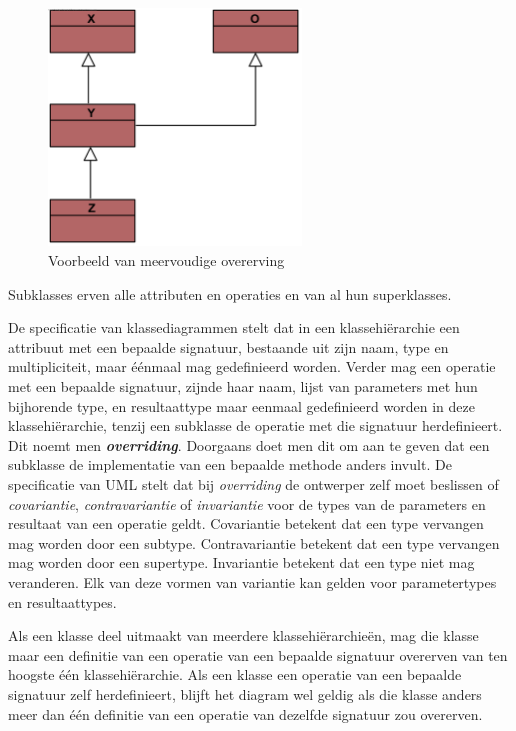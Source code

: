 \begin{figure}
	\centering
	\includegraphics[width=0.6\textwidth]{chap-consistentie/voorbeeld6.png}
	\caption{Voorbeeld van meervoudige overerving}
	\label{fig:multi-inheritance}
\end{figure}

Subklasses erven alle attributen en operaties en van al hun superklasses.

De specificatie van klassediagrammen stelt dat in een klassehi\"erarchie een attribuut met een bepaalde signatuur, bestaande uit zijn naam, type en multipliciteit, maar \'e\'enmaal mag gedefinieerd worden. Verder mag een operatie met een bepaalde signatuur, zijnde haar naam, lijst van parameters met hun bijhorende type, en resultaattype maar eenmaal gedefinieerd worden in deze klassehi\"erarchie, tenzij een subklasse de operatie met die signatuur herdefinieert. Dit noemt men \textit{\textbf{overriding}}. Doorgaans doet men dit om aan te geven dat een subklasse de implementatie van een bepaalde methode anders invult. De specificatie van UML\cite{OMG-UML} stelt dat bij \textit{overriding} de ontwerper zelf moet beslissen of \textit{covariantie}, \textit{contravariantie} of \textit{invariantie} voor de types van de parameters en resultaat van een operatie geldt. Covariantie betekent dat een type vervangen mag worden door een subtype. Contravariantie betekent dat een type vervangen mag worden door een supertype. Invariantie betekent dat een type niet mag veranderen. Elk van deze vormen van variantie kan gelden voor parametertypes en resultaattypes.

Als een klasse deel uitmaakt van meerdere klassehi\"erarchie\"en, mag die klasse maar een definitie van een operatie van een bepaalde signatuur overerven van ten hoogste \'e\'en klassehi\"erarchie. Als een klasse een operatie van een bepaalde signatuur zelf herdefinieert, blijft het diagram wel geldig als die klasse anders meer dan \'e\'en definitie van een operatie van dezelfde signatuur zou overerven.

